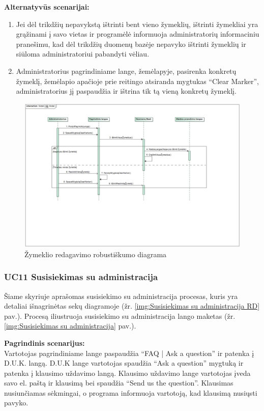 \documentclass{VUMIFPSkursinis}
\begin{document}
	\textbf{Alternatyvūs scenarijai:}
	\begin{enumerate}[itemsep=-2mm]
		\item Jei dėl trikdžių nepavykstą ištrinti bent vieno žymeklių, ištrinti žymekliai yra grąžinami į savo vietas ir programėlė informuoja administratorių informaciniu pranešimu, kad dėl trikdžių duomenų bazėje nepavyko ištrinti žymeklių ir siūloma administratoriui pabandyti vėliau.
		\item Administratorius pagrindiniame lange, žemėlapyje, pasirenka konkretų žymeklį, žemėlapio apačioje prie reitingo atsiranda mygtukas “Clear Marker”, administratorius jį paspaudžia ir ištrina tik tą vieną konkretų žymeklį.
	\end{enumerate} 
		\begin{figure}[H]
				\centering
				\includegraphics[scale=0.4]{img/AdminMarkerDeleteSequence}
				\caption{Žymeklio redagavimo robustiškumo diagrama}
				\label{img:Žymeklio radagavimo langas}
			\end{figure}


\subsubsection{UC11 Susisiekimas su administracija}
	Šiame skyriuje aprašomas susisiekimo su administracija procesas,  kuris yra detaliai išnagrinėtas sekų diagramoje (žr. \ref{img:Susisiekimas su administracija RD} pav.). 
	Procesą iliustruoja susisiekimo su administracija lango maketas (žr. \ref{img:Susisiekimas su administracija} pav.).

	\textbf{Pagrindinis scenarijus:}\\
	Vartotojas pagrindiniame lange paspaudžia “FAQ | Ask a question” ir patenka į D.U.K. langą. D.U.K lange vartotojas 
	spaudžia “Ask a question” mygtuką ir patenka į klausimo uždavimo langą. Klausimo uždavimo lange vartotojas įveda 
	savo el. paštą ir klausimą bei spaudžia “Send us the question”. Klausimas nusiunčiamas sėkmingai, o programa informuoja 
	vartotoją, kad klausimą nusiųsti pavyko.
\end{document}

